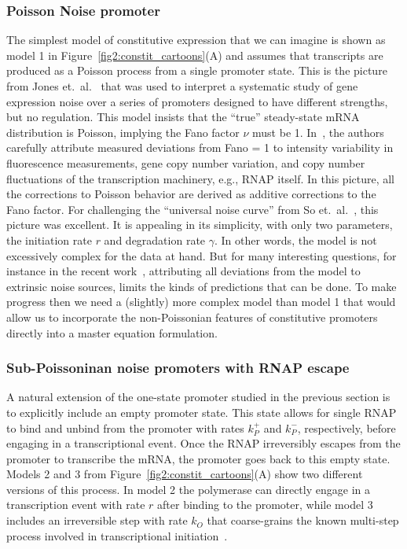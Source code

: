 \subsubsection{Poisson Noise promoter}

The simplest model of constitutive expression that we can imagine is shown as
model 1 in Figure~\ref{fig2:constit_cartoons}(A) and assumes that transcripts
are produced as a Poisson process from a single promoter state. This is the
picture from Jones et.\ al.~\cite{Jones2014} that was used to interpret a
systematic study of gene expression noise over a series of promoters designed to
have different strengths, but no regulation. This model insists that the
``true'' steady-state mRNA distribution is Poisson, implying the Fano factor
$\nu$ must be 1. In~\cite{Jones2014}, the authors carefully attribute measured
deviations from Fano = 1 to intensity variability in fluorescence measurements,
gene copy number variation, and copy number fluctuations of the transcription
machinery, e.g., RNAP itself. In this picture, all the corrections to Poisson
behavior are derived as additive corrections to the Fano factor. For challenging
the ``universal noise curve'' from So et.\ al.~\cite{So2011}, this picture was
excellent. It is appealing in its simplicity, with only two parameters, the
initiation rate $r$ and degradation rate $\gamma$. In other words, the model is
not excessively complex for the data at hand. But for many interesting
questions, for instance in the recent work~\cite{Razo-Mejia2020}, attributing
all deviations from the model to extrinsic noise sources, limits the kinds of
predictions that can be done. To make progress then we need a (slightly) more
complex model than model 1 that would allow us to incorporate the non-Poissonian
features of constitutive promoters directly into a master equation formulation.

\subsubsection{Sub-Poissoninan noise promoters with RNAP escape}
A natural extension of the one-state promoter studied in the previous section is
to explicitly include an empty promoter state. This state allows for single RNAP
to bind and unbind from the promoter with rates $k_P^+$ and $k_P^-$,
respectively, before engaging in a transcriptional event. Once the RNAP
irreversibly escapes from the promoter to transcribe the mRNA, the promoter goes
back to this empty state. Models 2 and 3 from
Figure~\ref{fig2:constit_cartoons}(A) show two different versions of this
process. In model 2 the polymerase can directly engage in a transcription event
with rate $r$ after binding to the promoter, while model 3 includes an
irreversible step with rate $k_O$ that coarse-grains the known multi-step
process involved in transcriptional initiation~\cite{DeHaseth1998}.

